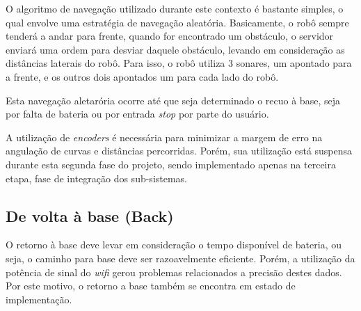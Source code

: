 	 	O algoritmo de navegação utilizado durante este contexto é bastante simples, o qual envolve uma estratégia de navegação aleatória. Basicamente, o robô sempre tenderá a andar para frente, quando for encontrado um obstáculo, o servidor enviará uma ordem para desviar daquele obstáculo, levando em consideração as distâncias laterais do robô. Para isso, o robô utiliza 3 sonares, um apontado para a frente, e os outros dois apontados um para cada lado do robô.

	 	Esta navegação aletarória ocorre até que seja determinado o recuo à base, seja por falta de bateria ou por entrada \textit{stop} por parte do usuário.

	 	A utilização de \textit{encoders} é necessária para minimizar a margem de erro na angulação de curvas e distâncias percorridas. Porém, sua utilização está suspensa durante esta segunda fase do projeto, sendo implementado apenas na terceira etapa, fase de integração dos sub-sistemas.

	 \subsection{De volta à base (Back)} %
	 \label{sub:de_volta_a_base_}
	 	
	 	O retorno à base deve levar em consideração o tempo disponível de bateria, ou seja, o caminho para base deve ser razoavelmente eficiente. Porém, a utilização da potência de sinal do \textit{wifi} gerou problemas relacionados a precisão destes dados. Por este motivo, o retorno a base também se encontra em estado de implementação. 

